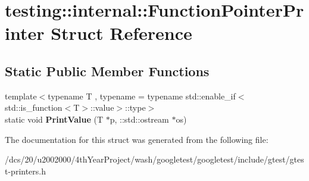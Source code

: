 \hypertarget{structtesting_1_1internal_1_1FunctionPointerPrinter}{}\section{testing\+:\+:internal\+:\+:Function\+Pointer\+Printer Struct Reference}
\label{structtesting_1_1internal_1_1FunctionPointerPrinter}
\subsection*{Static Public Member Functions}
\begin{DoxyCompactItemize}
\item 
\mbox{\label{structtesting_1_1internal_1_1FunctionPointerPrinter_aad7aabdb45136903d414d66f08465d30}} 
{\footnotesize template$<$typename T , typename  = typename std\+::enable\+\_\+if$<$                            std\+::is\+\_\+function$<$\+T$>$\+::value$>$\+::type$>$ }\\static void {\bfseries Print\+Value} (T $\ast$p, \+::std\+::ostream $\ast$os)
\end{DoxyCompactItemize}


The documentation for this struct was generated from the following file\+:\begin{DoxyCompactItemize}
\item 
/dcs/20/u2002000/4th\+Year\+Project/wash/googletest/googletest/include/gtest/gtest-\/printers.\+h\end{DoxyCompactItemize}
